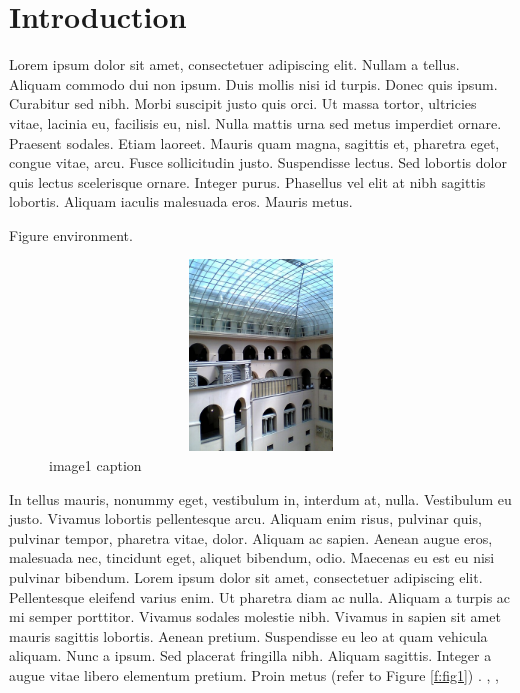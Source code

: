 \chapter{Introduction}
\label{k:einleitung} Lorem ipsum dolor sit amet, consectetuer adipiscing elit.
Nullam a tellus. Aliquam commodo dui non ipsum. Duis mollis nisi id turpis.
Donec quis ipsum. Curabitur sed nibh. Morbi suscipit justo quis orci. Ut massa
tortor, ultricies vitae, lacinia eu, facilisis eu, nisl. Nulla mattis urna sed
metus imperdiet ornare. Praesent sodales. Etiam laoreet. Mauris quam magna,
sagittis et, pharetra eget, congue vitae, arcu. Fusce sollicitudin justo.
Suspendisse lectus. Sed lobortis dolor quis lectus scelerisque ornare. Integer
purus. Phasellus vel elit at nibh sagittis lobortis. Aliquam iaculis malesuada
eros. Mauris metus.

Figure environment.

\begin{figure}
\centering
\includegraphics[height=2.0in,width=5.0in]{./section-introduction/figures/uzhlichthof.jpg}
\caption{image1 caption}
\label{f:figtag}
\end{figure}



In tellus mauris, nonummy eget, vestibulum in, interdum at, nulla. Vestibulum
eu justo. Vivamus lobortis pellentesque arcu. Aliquam enim risus, pulvinar
quis, pulvinar tempor, pharetra vitae, dolor. Aliquam ac sapien. Aenean augue
eros, malesuada nec, tincidunt eget, aliquet bibendum, odio. Maecenas eu est eu
nisi pulvinar bibendum. Lorem ipsum dolor sit amet, consectetuer adipiscing
elit. Pellentesque eleifend varius enim. Ut pharetra diam ac nulla. Aliquam a
turpis ac mi semper porttitor. Vivamus sodales molestie nibh. Vivamus in sapien
sit amet mauris sagittis lobortis. Aenean pretium. Suspendisse eu leo at quam
vehicula aliquam. Nunc a ipsum. Sed placerat fringilla nibh. Aliquam sagittis.
Integer a augue vitae libero elementum pretium. Proin metus (refer to Figure
\ref{f:fig1}) \cite{salton83introduction}. \cite{creditanalysis}, \cite{baselhistory_bis},
\cite{investopediabaselaccord}

